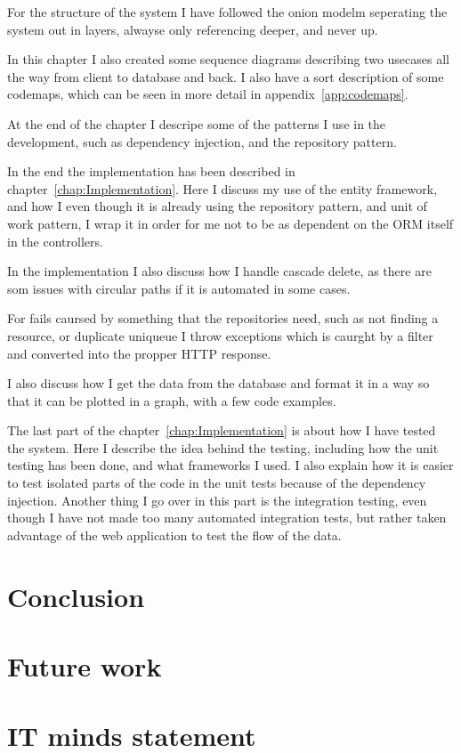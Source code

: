 For the structure of the system I have followed the onion modelm seperating the
system out in layers, alwayse only referencing deeper, and never up.

In this chapter I also created some sequence diagrams describing two usecases
all the way from client to database and back. I also have a sort description of
some codemaps, which can be seen in more detail in appendix~\ref{app:codemaps}.

At the end of the chapter I descripe some of the patterns I use in the
development, such as dependency injection, and the repository pattern.

In the end the implementation has been described in
chapter~\ref{chap:Implementation}. Here I discuss my use of the entity
framework, and how I even though it is already using the repository pattern, and
unit of work pattern, I wrap it in order for me not to be as dependent on the
ORM itself in the controllers.

In the implementation I also discuss how I handle cascade delete, as there are
som issues with circular paths if it is automated in some cases.

For fails caursed by something that the repositories need, such as not finding a
resource, or duplicate uniqueue I throw exceptions which is caurght by a filter
and converted into the propper HTTP response.

I also discuss how I get the data from the database and format it in a way so
that it can be plotted in a graph, with a few code examples.

The last part of the chapter~\ref{chap:Implementation} is about how I have
tested the system. Here I describe the idea behind the testing, including how
the unit testing has been done, and what frameworks I used. I also explain how
it is easier to test isolated parts of the code in the unit tests because of the
dependency injection. Another thing I go over in this part is the integration
testing, even though I have not made too many automated integration tests, but
rather taken advantage of the web application to test the flow of the data.

\section{Conclusion}


\section{Future work}
  
\section{IT minds statement}
